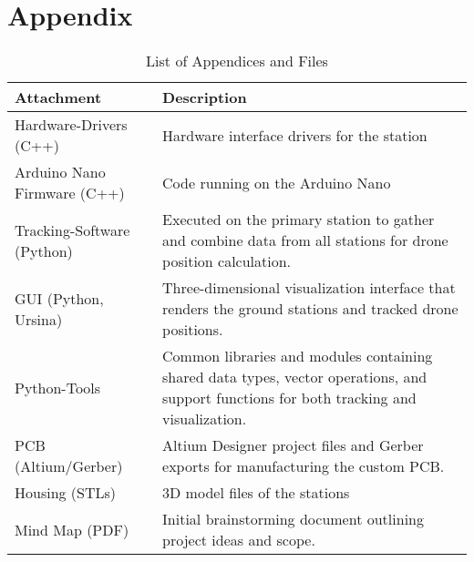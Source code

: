 \chapter*{Appendix}

\begin{table}[H]
	\centering
	\renewcommand{\arraystretch}{1.4}
	\setlength{\tabcolsep}{8pt}
	\begin{tabular}{p{} p{}}
		\hline
		\textbf{Attachment} & \textbf{Description} \\
		\hline
		Hardware-Drivers (C++)
		& Hardware interface drivers for the station\\
		
		Arduino Nano Firmware (C++)
		& Code running on the Arduino Nano\\
		
		Tracking-Software (Python)
		& Executed on the primary station to gather and combine data from all stations for drone position calculation.\\
		
		GUI (Python, Ursina)
		& Three-dimensional visualization interface that renders the ground stations and tracked drone positions.\\
		
		Python-Tools
		& Common libraries and modules containing shared data types, vector operations, and support functions for both tracking and visualization.\\
		
		PCB (Altium/Gerber)
		& Altium Designer project files and Gerber exports for manufacturing the custom PCB.\\
		
		Housing (STLs)
		& 3D model files of the stations\\
		
		Mind Map (PDF)
		& Initial brainstorming document outlining project ideas and scope.\\
		\hline
	\end{tabular}
	\caption{List of Appendices and Files}
	\label{tab:appendixfiles}
\end{table}
